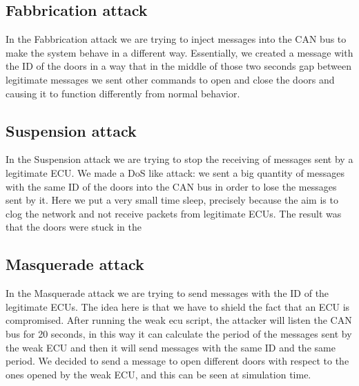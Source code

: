 \documentclass[12pt]{article}
\begin{document}
\subsection{Fabbrication attack}
In the Fabbrication attack we are trying to inject messages into the CAN bus to make the system behave in a 
different way. Essentially, we created a message with the ID of the doors in a way that in the middle of 
those two seconds gap between legitimate messages we sent other commands to open and close the doors and 
causing it to function differently from normal behavior.
\subsection{Suspension attack}
In the Suspension attack we are trying to stop the receiving of messages sent by a legitimate ECU. We made 
a DoS like attack: we sent a big quantity of messages with the same ID of the doors into the CAN bus in order 
to lose the messages sent by it. Here we put a very small time sleep, precisely because the aim is to clog 
the network and not receive packets from legitimate ECUs. The result was that the doors were stuck in the 

\subsection{Masquerade attack}
In the Masquerade attack we are trying to send messages with the ID of the legitimate ECUs. The idea here 
is that we have to shield the fact that an ECU is compromised. After running the weak ecu script, the 
attacker will listen the CAN bus for 20 seconds, in this way it can calculate the period of the messages 
sent by the weak ECU and then it will send messages with the same ID and the same period. We decided to 
send a message to open different doors with respect to the ones opened by the weak ECU, and this can be 
seen at simulation time.
\end{document}
